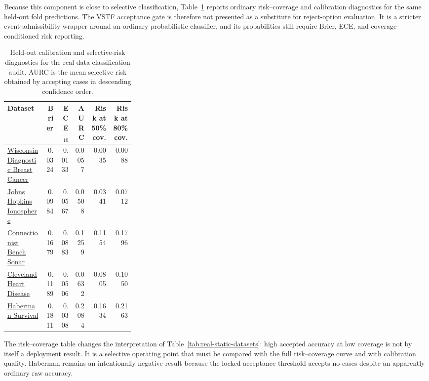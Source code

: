 \documentclass[11pt,a4paper]{article}
\newcommand{\1}{\mathbf{1}}
\begin{document}
Because this component is close to selective classification, Table~\ref{tab:real-static-risk-calibration} reports ordinary risk--coverage and calibration diagnostics for the same held-out fold predictions. The VSTF acceptance gate is therefore not presented as a substitute for reject-option evaluation. It is a stricter event-admissibility wrapper around an ordinary probabilistic classifier, and its probabilities still require Brier, ECE, and coverage-conditioned risk reporting.

\begin{table}[h]
\centering
\caption{Held-out calibration and selective-risk diagnostics for the real-data classification audit. AURC is the mean selective risk obtained by accepting cases in descending confidence order.}
\label{tab:real-static-risk-calibration}
\scriptsize
\begin{adjustbox}{max width=\linewidth}
\begin{tabular}{p{0.30\linewidth}rrrrr}
\toprule
Dataset & Brier & ECE$_{10}$ & AURC & Risk at 50\% cov. & Risk at 80\% cov. \\
\midrule
\href{https://archive.ics.uci.edu/ml/machine-learning-databases/breast-cancer-wisconsin/wdbc.data}{Wisconsin Diagnostic Breast Cancer} & 0.0324 & 0.0133 & 0.0057 & 0.0035 & 0.0088 \\
\href{https://archive.ics.uci.edu/ml/machine-learning-databases/ionosphere/ionosphere.data}{Johns Hopkins Ionosphere} & 0.0984 & 0.0567 & 0.0508 & 0.0341 & 0.0712 \\
\href{https://archive.ics.uci.edu/ml/machine-learning-databases/undocumented/connectionist-bench/sonar/sonar.all-data}{Connectionist Bench Sonar} & 0.1679 & 0.0883 & 0.1259 & 0.1154 & 0.1796 \\
\href{https://archive.ics.uci.edu/ml/machine-learning-databases/heart-disease/processed.cleveland.data}{Cleveland Heart Disease} & 0.1189 & 0.0506 & 0.0632 & 0.0805 & 0.1050 \\
\href{https://archive.ics.uci.edu/ml/machine-learning-databases/haberman/haberman.data}{Haberman Survival} & 0.1811 & 0.0308 & 0.2084 & 0.1634 & 0.2163 \\
\bottomrule
\end{tabular}
\end{adjustbox}
\end{table}

The risk--coverage table changes the interpretation of Table~\ref{tab:real-static-datasets}: high accepted accuracy at low coverage is not by itself a deployment result. It is a selective operating point that must be compared with the full risk--coverage curve and with calibration quality. Haberman remains an intentionally negative result because the locked acceptance threshold accepts no cases despite an apparently ordinary raw accuracy.
\end{document}
